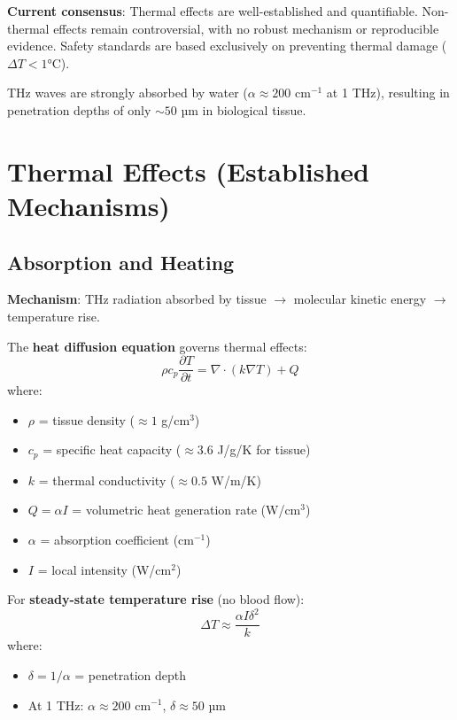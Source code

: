 \begin{keyconcept}
\textbf{Current consensus}: Thermal effects are well-established and quantifiable. Non-thermal effects remain controversial, with no robust mechanism or reproducible evidence. Safety standards are based exclusively on preventing thermal damage ($\Delta T < 1°$C).
\end{keyconcept}

THz waves are strongly absorbed by water ($\alpha \approx 200$ cm$^{-1}$ at 1 THz), resulting in penetration depths of only $\sim 50$ µm in biological tissue.

\section{Thermal Effects (Established Mechanisms)}

\subsection{Absorption and Heating}

\textbf{Mechanism}: THz radiation absorbed by tissue $\rightarrow$ molecular kinetic energy $\rightarrow$ temperature rise.

The \textbf{heat diffusion equation} governs thermal effects:
\begin{equation}
\rho c_p \frac{\partial T}{\partial t} = \nabla \cdot (k \nabla T) + Q
\end{equation}
where:
\begin{itemize}
\item $\rho$ = tissue density ($\approx 1$ g/cm$^3$)
\item $c_p$ = specific heat capacity ($\approx 3.6$ J/g/K for tissue)
\item $k$ = thermal conductivity ($\approx 0.5$ W/m/K)
\item $Q = \alpha I$ = volumetric heat generation rate (W/cm$^3$)
\item $\alpha$ = absorption coefficient (cm$^{-1}$)
\item $I$ = local intensity (W/cm$^2$)
\end{itemize}

For \textbf{steady-state temperature rise} (no blood flow):
\begin{equation}
\Delta T \approx \frac{\alpha I \delta^2}{k}
\end{equation}
where:
\begin{itemize}
\item $\delta = 1/\alpha$ = penetration depth
\item At 1 THz: $\alpha \approx 200$ cm$^{-1}$, $\delta \approx 50$ µm
\end{itemize}

